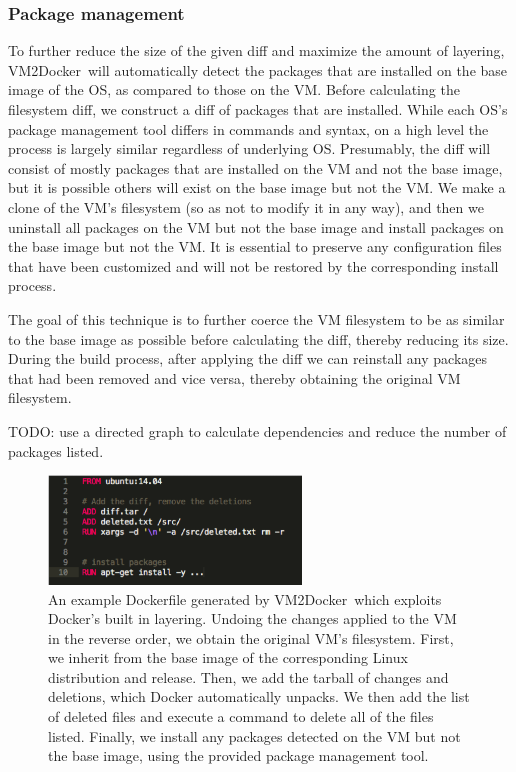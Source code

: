 \documentclass[\myfontsize, letterpaper]{article}
\newcommand{\projectname}{VM2Docker}
\begin{document}
\subsubsection{Package management}
To further reduce the size of the given diff and maximize the amount of layering, \projectname\ will automatically detect the packages that are installed on the base image of the OS, as compared to those on the VM. Before calculating the filesystem diff, we construct a diff of packages that are installed. While each OS's package management tool differs in commands and syntax, on a high level the process is largely similar regardless of underlying OS. Presumably, the diff will consist of mostly packages that are installed on the VM and not the base image, but it is possible others will exist on the base image but not the VM. We make a clone of the VM's filesystem (so as not to modify it in any way), and then we uninstall all packages on the VM but not the base image and install packages on the base image but not the VM. It is essential to preserve any configuration files that have been customized and will not be restored by the corresponding install process.

The goal of this technique is to further coerce the VM filesystem to be as similar to the base image as possible before calculating the diff, thereby reducing its size. During the build process, after applying the diff we can reinstall any packages that had been removed and vice versa, thereby obtaining the original VM filesystem.

TODO: use a directed graph to calculate dependencies and reduce the number of packages listed.

\begin{figure}[h]
\centering
    \includegraphics[width=0.6\textwidth]{dockerfile.png}
    \caption{An example Dockerfile generated by \projectname\ which exploits Docker's built in layering. Undoing the changes applied to the VM in the reverse order, we obtain the original VM's filesystem. First, we inherit from the base image of the corresponding Linux distribution and release. Then, we add the tarball of changes and deletions, which Docker automatically unpacks. We then add the list of deleted files and execute a command to delete all of the files listed. Finally, we install any packages detected on the VM but not the base image, using the provided package management tool.}
\end{figure}
\end{document}

